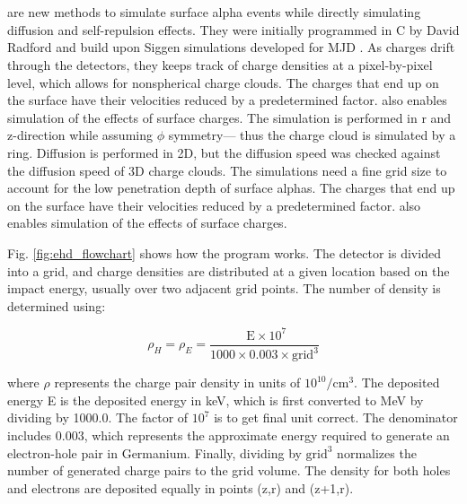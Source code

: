 

\section{{\tdsim}}

{\tdsim} are new methods to simulate surface alpha events while directly simulating diffusion and self-repulsion effects. They were initially programmed in C by David Radford and build upon Siggen simulations developed for MJD \cite{siggen_paper}. As charges drift through the detectors, they keeps track of charge densities at a pixel-by-pixel level, which allows for nonspherical charge clouds. The charges that end up on the surface have their velocities reduced by a predetermined factor. {\tdsim} also enables simulation of the effects of surface charges. The simulation is performed in r and z-direction while assuming $\phi$ symmetry— thus the charge cloud is simulated by a ring. Diffusion is performed in 2D, but the diffusion speed was checked against the diffusion speed of 3D charge clouds. The simulations need a fine grid size to account for the low penetration depth of surface alphas. The charges that end up on the surface have their velocities reduced by a predetermined factor. {\tdsim} also enables simulation of the effects of surface charges.


Fig. \ref{fig:ehd_flowchart} shows how the {\tdsim} program works. The detector is divided into a grid, and charge densities are distributed at a given location based on the impact energy, usually over two adjacent grid points. The number of density is determined using:

\begin{equation}
    \rho_H = \rho_E= \frac{\text{ E}\times 10^7 }{1000 \times 0.003 \times \text{grid}^3}
\end{equation}

where $\rho$ represents the charge pair density in units of \(10^{10}/\text{cm}^3\). The deposited energy E is the deposited energy in keV, which is first converted to MeV by dividing by 1000.0. The factor of \(10^7\) is to get final unit correct. The denominator includes \(0.003\), which represents the approximate energy required to generate an electron-hole pair in Germanium. Finally, dividing by \(\text{grid}^3\) normalizes the number of generated charge pairs to the grid volume. The density for both holes and electrons are deposited equally in points (z,r) and (z+1,r).

